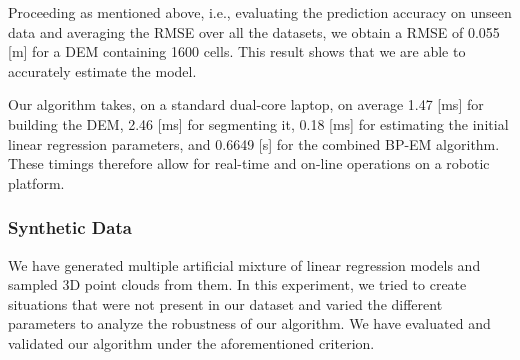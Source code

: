 Proceeding as mentioned above, i.e., evaluating the prediction accuracy on
unseen data and averaging the RMSE over all the datasets, we obtain a RMSE of
0.055 [m] for a DEM containing 1600 cells. This result shows that we are able
to accurately estimate the model.

Our algorithm takes, on a standard dual-core laptop, on average 1.47 [ms] for
building the DEM, 2.46 [ms] for segmenting it, 0.18 [ms] for estimating the
initial linear regression parameters, and 0.6649 [s] for the combined BP-EM
algorithm. These timings therefore allow for real-time and on-line operations on
a robotic platform.

\subsubsection{Synthetic Data}

We have generated multiple artificial mixture of linear regression models and
sampled 3D point clouds from them. In this experiment, we tried to create
situations that were not present in our dataset and varied the different
parameters to analyze the robustness of our algorithm. We have evaluated and
validated our algorithm under the aforementioned criterion.
